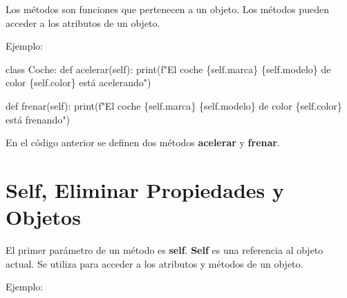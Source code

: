 \documentclass[
  a4paper,
  DIV=11,
  numbers=noendperiod,
  onepage,
  openany]{scrreprt}
\newenvironment{Shaded}{\begin{snugshade}}{\end{snugshade}}
\newcommand{\BuiltInTok}[1]{\textcolor[rgb]{0.00,0.23,0.31}{#1}}
\newcommand{\KeywordTok}[1]{\textcolor[rgb]{0.00,0.23,0.31}{#1}}
\newcommand{\NormalTok}[1]{\textcolor[rgb]{0.00,0.23,0.31}{#1}}
\newcommand{\SpecialCharTok}[1]{\textcolor[rgb]{0.37,0.37,0.37}{#1}}
\newcommand{\SpecialStringTok}[1]{\textcolor[rgb]{0.13,0.47,0.30}{#1}}
\newcommand{\VariableTok}[1]{\textcolor[rgb]{0.07,0.07,0.07}{#1}}
\begin{document}
Los métodos son funciones que pertenecen a un objeto. Los métodos pueden
acceder a los atributos de un objeto.

Ejemplo:

\begin{Shaded}
\begin{Highlighting}[]
\KeywordTok{class}\NormalTok{ Coche:}
    \KeywordTok{def}\NormalTok{ acelerar(}\VariableTok{self}\NormalTok{):}
        \BuiltInTok{print}\NormalTok{(}\SpecialStringTok{f"El coche }\SpecialCharTok{\{}\VariableTok{self}\SpecialCharTok{.}\NormalTok{marca}\SpecialCharTok{\}}\SpecialStringTok{ }\SpecialCharTok{\{}\VariableTok{self}\SpecialCharTok{.}\NormalTok{modelo}\SpecialCharTok{\}}\SpecialStringTok{ de color }\SpecialCharTok{\{}\VariableTok{self}\SpecialCharTok{.}\NormalTok{color}\SpecialCharTok{\}}\SpecialStringTok{ está acelerando"}\NormalTok{)}

    \KeywordTok{def}\NormalTok{ frenar(}\VariableTok{self}\NormalTok{):}
        \BuiltInTok{print}\NormalTok{(}\SpecialStringTok{f"El coche }\SpecialCharTok{\{}\VariableTok{self}\SpecialCharTok{.}\NormalTok{marca}\SpecialCharTok{\}}\SpecialStringTok{ }\SpecialCharTok{\{}\VariableTok{self}\SpecialCharTok{.}\NormalTok{modelo}\SpecialCharTok{\}}\SpecialStringTok{ de color }\SpecialCharTok{\{}\VariableTok{self}\SpecialCharTok{.}\NormalTok{color}\SpecialCharTok{\}}\SpecialStringTok{ está frenando"}\NormalTok{)}
\end{Highlighting}
\end{Shaded}

En el código anterior se definen dos métodos \textbf{acelerar} y
\textbf{frenar}.

\section{Self, Eliminar Propiedades y
Objetos}\label{self-eliminar-propiedades-y-objetos}

El primer parámetro de un método es \textbf{self}. \textbf{Self} es una
referencia al objeto actual. Se utiliza para acceder a los atributos y
métodos de un objeto.

Ejemplo:
\end{document}

